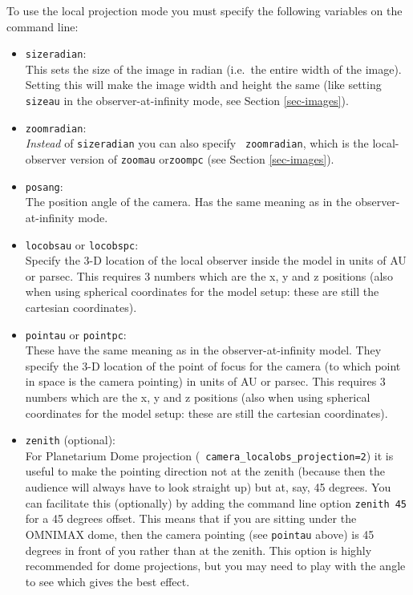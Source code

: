 \documentclass{report}
\begin{document}
To use the local projection mode you must specify the following variables
on the command line:
\begin{itemize}
\item {\small\tt sizeradian}:\\
  This sets the size of the image in radian (i.e.\ the entire width of the
  image). Setting this will make the image width and height the same (like
  setting {\small\tt sizeau} in the observer-at-infinity mode, see Section
  \ref{sec-images}).
\item {\small\tt zoomradian}:\\
  {\em Instead} of {\small\tt sizeradian} you can also specify {\small\tt
    zoomradian}, which is the local-observer version of {\small\tt zoomau}
  or{\small\tt zoompc} (see Section \ref{sec-images}).
\item {\small\tt posang}:\\
  The position angle of the camera. Has the same meaning as in the
  observer-at-infinity mode.
\item {\small\tt locobsau} or {\small\tt locobspc}:\\
  Specify the 3-D location of the local observer inside the model in units
  of AU or parsec. This requires 3 numbers which are the x, y and z
  positions (also when using spherical coordinates for the model setup:
  these are still the cartesian coordinates).
\item {\small\tt pointau} or {\small\tt pointpc}:\\
  These have the same meaning as in the observer-at-infinity model.  They
  specify the 3-D location of the point of focus for the camera (to which
  point in space is the camera pointing) in units of AU or parsec. This
  requires 3 numbers which are the x, y and z positions (also when using
  spherical coordinates for the model setup: these are still the cartesian
  coordinates).
\item {\small\tt zenith} (optional):\\
  For Planetarium Dome projection ({\small\tt
    camera\_localobs\_projection=2}) it is useful to make the pointing
  direction not at the zenith (because then the audience will always have to
  look straight up) but at, say, 45 degrees. You can facilitate this
  (optionally) by adding the command line option {\small\tt zenith 45} for a
  45 degrees offset. This means that if you are sitting under the OMNIMAX
  dome, then the camera pointing (see {\small\tt pointau} above) is 45
  degrees in front of you rather than at the zenith. This option is highly
  recommended for dome projections, but you may need to play with the angle
  to see which gives the best effect.
\end{itemize}
\end{document}
